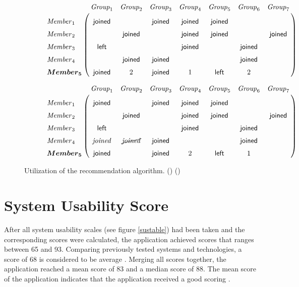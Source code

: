 \documentclass[12pt,numbers=noenddot,parskip,bibliography=totocnumbered,listof=totocnumbered,draft]{scrreprt}
\begin{document}
\begin{figure}
\begin{subfigure}[t]{\textwidth}%
\centering
$\bordermatrix{~ & \mathit{Group}_1 & \mathit{Group}_2 & \mathit{Group}_3 & \mathit{Group}_4 & \mathit{Group}_5 & \mathit{Group}_6 & \mathit{Group}_7 \cr
\vphantom{\vdots}\mathit{Member}_1 & \mathsf{joined} & & \mathsf{joined} & \mathsf{joined} & \mathsf{joined} & & \cr
\vphantom{\vdots}\mathit{Member}_2 &  & \mathsf{joined} & & \mathsf{joined} & \mathsf{joined} & & \mathsf{joined} \cr
\vphantom{\vdots}\mathit{Member}_3 & \mathsf{left} & & & \mathsf{joined} & & \mathsf{joined} & \cr
\vphantom{\vdots}\mathit{Member}_4 & & \mathsf{joined} & \mathsf{joined} & & & \mathsf{joined} & \cr
\vphantom{\vdots}\bm{{Member}_5} & \mathsf{joined} & 2 & \mathsf{joined} & 1 & \mathsf{left} & 2 & \cr  }$
\caption{}
\label{utilizealgorithm0}
\end{subfigure}%

\bigskip

\begin{subfigure}[b]{\textwidth}%
\centering
$\bordermatrix{~ & \mathit{Group}_1 & \mathit{Group}_2 & \mathit{Group}_3 & \mathit{Group}_4 & \mathit{Group}_5 & \mathit{Group}_6 & \mathit{Group}_7 \cr
\vphantom{\vdots}\mathit{Member}_1 & \mathsf{joined} & & \mathsf{joined} & \mathsf{joined} & \mathsf{joined} & & \cr
\vphantom{\vdots}\mathit{Member}_2 &  & \mathsf{joined} & & \mathsf{joined} & \mathsf{joined} & & \mathsf{joined} \cr
\vphantom{\vdots}\mathit{Member}_3 & \mathsf{left} & & & \mathsf{joined} & & \mathsf{joined} & \cr
\vphantom{\vdots}\mathit{Member}_4 & \mathit{joined} & \cancel{\mathit{joined}} & \mathsf{joined} & & & \mathsf{joined} & \cr
\vphantom{\vdots}\bm{{Member}_5} & \mathsf{joined} & & \mathsf{joined} & 2 & \mathsf{left} & 1 & \cr  }$   
\caption{}
\label{utilizealgorithm1}
\end{subfigure}%
\caption[Utilization of the recommendation algorithm]{Utilization of the recommendation algorithm. () () }
\label{utilizealgorithm}
\end{figure}

\section{System Usability Score}
After all system usability scales (see figure \ref{sustable}) had been taken and the corresponding scores were calculated, the application achieved scores that ranges between 65 and 93. Comparing previously tested systems and technologies, a score of 68 is considered to be average \citep[p. 36]{brooke2013}. Merging all scores together, the application reached a mean score of 83 and a median score of 88. The mean score of the application indicates that the application received a good scoring \citep[p. 36]{brooke2013}. 
\end{document}
